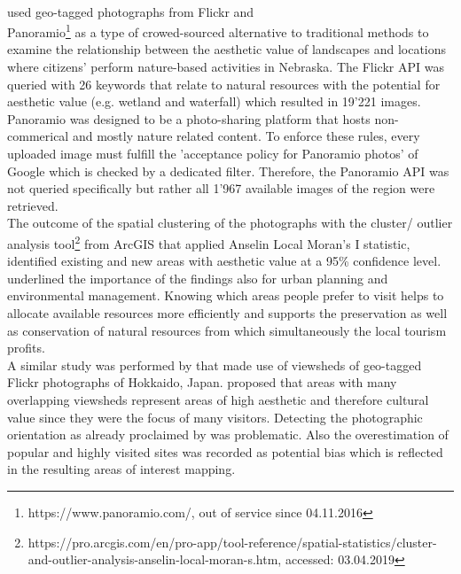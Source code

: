 \paragraph*{\textcite{Figueroa-Alfaro2017}} used geo-tagged photographs from Flickr and \\ Panoramio\footnote{https://www.panoramio.com/, out of service since 04.11.2016} as a type of crowed-sourced alternative to traditional methods to examine the relationship between the aesthetic value of landscapes and locations where citizens' perform nature-based activities in Nebraska. The Flickr API was queried with 26 keywords that relate to natural resources with the potential for aesthetic value (e.g. wetland and waterfall) which resulted in 19'221 images. Panoramio was designed to be a photo-sharing platform that hosts non-commerical and mostly nature related content. To enforce these rules, every uploaded image must fulfill the 'acceptance policy for Panoramio photos' of Google which is checked by a dedicated filter. Therefore, the Panoramio API was not queried specifically but rather all 1'967 available images of the region were retrieved.\\
The outcome of the spatial clustering of the photographs with the cluster/ outlier analysis tool\footnote{https://pro.arcgis.com/en/pro-app/tool-reference/spatial-statistics/cluster-and-outlier-analysis-anselin-local-moran-s.htm, accessed: 03.04.2019} from ArcGIS that applied Anselin Local Moran's I statistic, identified existing and new areas with aesthetic value at a 95\% confidence level. \citeauthor{Figueroa-Alfaro2017} underlined the importance of the findings also for urban planning and environmental management. Knowing which areas people prefer to visit helps to allocate available resources more efficiently and supports the preservation as well as conservation of natural resources from which simultaneously the local tourism profits. \\
\newline
A similar study was performed by \textcite{Yoshimura2017} that made use of viewsheds of geo-tagged Flickr photographs of Hokkaido, Japan. \citeauthor{Yoshimura2017} proposed that areas with many overlapping viewsheds represent areas of high aesthetic and therefore cultural value since they were the focus of many visitors. Detecting the photographic orientation as already proclaimed by \textcite{Unknown2013} was problematic. Also the overestimation of popular and highly visited sites was recorded as potential bias which is reflected in the resulting areas of interest mapping.


